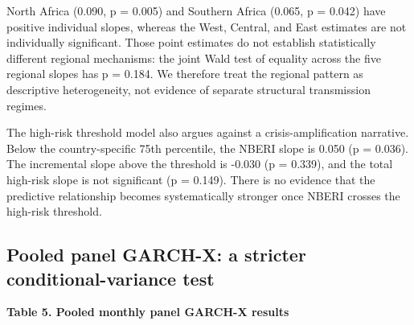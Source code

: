 \documentclass[11pt]{article}
\begin{document}
North Africa (0.090, p = 0.005) and Southern Africa (0.065, p = 0.042)
have positive individual slopes, whereas the West, Central, and East
estimates are not individually significant. Those point estimates do not
establish statistically different regional mechanisms: the joint Wald
test of equality across the five regional slopes has p = 0.184. We
therefore treat the regional pattern as descriptive heterogeneity, not
evidence of separate structural transmission regimes.

The high-risk threshold model also argues against a crisis-amplification
narrative. Below the country-specific 75th percentile, the NBERI slope
is 0.050 (p = 0.036). The incremental slope above the threshold is
-0.030 (p = 0.339), and the total high-risk slope is not significant (p
= 0.149). There is no evidence that the predictive relationship becomes
systematically stronger once NBERI crosses the high-risk threshold.

\subsection{Pooled panel GARCH-X: a stricter conditional-variance
test}\label{pooled-panel-garch-x-a-stricter-conditional-variance-test}

\textbf{Table 5. Pooled monthly panel GARCH-X results}
\end{document}
